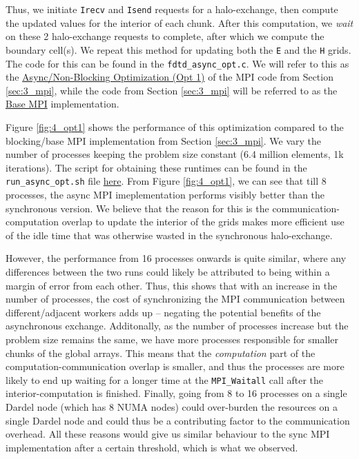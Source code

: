 \documentclass[a4paper,10pt]{article}
\begin{document}
Thus, we initiate  \verb|Irecv| and \verb|Isend| requests for a halo-exchange, then compute the updated values for the interior of each chunk. After this computation, we \textit{wait} on these 2 halo-exchange requests to complete, after which we compute the boundary cell(s). We repeat this method for updating both the \verb|E| and the \verb|H| grids. The code for this can be found in the \verb|fdtd_async_opt.c|. We will refer to this as the \underline{Async/Non-Blocking Optimization (Opt 1)} of the MPI code from Section \ref{sec:3_mpi}, while the code from Section \ref{sec:3_mpi} will be referred to as the \underline{Base MPI} implementation.

Figure \ref{fig:4_opt1} shows the performance of this optimization compared to the blocking/base MPI implementation from Section \ref{sec:3_mpi}. We vary the number of processes keeping the problem size constant (6.4 million elements, 1k iterations). The script for obtaining these runtimes can be found in the \verb|run_async_opt.sh| file \href{https://github.com/paulmyr/DD2356-MethodsHPC/blob/master/5_project/4_opt/run_async_opt.sh}{here}. From Figure \ref{fig:4_opt1}, we can see that till 8 processes, the async MPI imeplementation performs visibly better than the synchronous version. We believe that the reason for this is the communication-computation overlap to update the interior of the grids makes more efficient use of the idle time that was otherwise wasted in the synchronous halo-exchange.

However, the performance from 16 processes onwards is quite similar, where any differences between the two runs could likely be attributed to being within a margin of error from each other. Thus, this shows that with an increase in the number of processes, the cost of synchronizing the MPI communication between different/adjacent workers adds up -- negating the potential benefits of the asynchronous exchange. Additonally, as the number of processes increase but the problem size remains the same, we have more processes responsible for smaller chunks of the global arrays. This means that the \textit{computation} part of the computation-communication overlap is smaller, and thus the processes are more likely to end up waiting for a longer time at the \verb|MPI_Waitall| call after the interior-computation is finished. Finally, going from 8 to 16 processes on a single Dardel node (which has 8 NUMA nodes) could over-burden the resources on a single Dardel node and could thus be a contributing factor to the communication overhead. All these reasons would give us similar behaviour to the sync MPI implementation after a certain threshold, which is what we observed.
\end{document}
